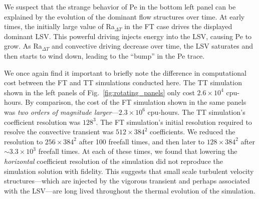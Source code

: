 \documentclass[aps, pre, onecolumn, nofootinbib, notitlepage, groupedaddress, amsfonts, amssymb, amsmath, longbibliography, superscriptaddress]{revtex4-1}
\begin{document}
We suspect that the strange behavior of Pe in the bottom left panel can be explained by the evolution of the dominant flow structures over time.
At early times, the initially large value of Ra$_{\Delta T}$ in the FT case drives the displayed dominant LSV.
This powerful driving injects energy into the LSV, causing Pe to grow.
As Ra$_{\Delta T}$ and convective driving decrease over time, the LSV saturates and then starts to wind down, leading to the ``bump'' in the Pe trace.

We once again find it important to briefly note the difference in computational cost between the FT and TT simulations conducted here.
The TT simulation shown in the left panels of Fig.~\ref{fig:rotating_panels} only cost $2.6 \times 10^4$ cpu-hours.
By comparison, the cost of the FT simulation shown in the same panels was \emph{two orders of magnitude larger}---$2.3 \times 10^6$ cpu-hours.
The TT simulation's coefficient resolution was $128^3$.
The FT simulation's initial resolution required to resolve the convective transient was $512\times384^2$ coefficients.
We reduced the resolution to $256\times384^2$ after 100 freefall times, and then later to $128\times384^2$ after $\sim3.3 \times 10^3$ freefall times.
At each of these times, we found that lowering the \emph{horizontal} coefficient resolution of the simulation did not reproduce the simulation solution with fidelity.
This suggests that small scale turbulent velocity structures---which are injected by the vigorous transient and perhaps associated with the LSV---are long lived throughout the thermal evolution of the simulation.
\end{document}
